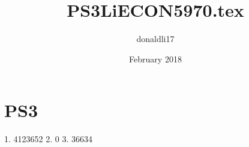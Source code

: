 \documentclass{article}
\title{PS3LiECON5970.tex}
\author{donaldli17 }
\date{February 2018}
\begin{document}
\maketitle

\section{PS3}
1. 4123652
2. 0
3. 36634
\end{document}
